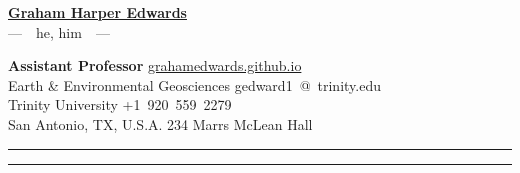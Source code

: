 \documentclass[10pt]{article}
\begin{document}
\begin{center}
\LARGE\textbf{\underline{Graham Harper Edwards}}\\[.3em]
\large ---~~he, him~~---
\end{center}

\textbf{Assistant Professor} \hfill \href{https://grahamedwards.github.io}{grahamedwards.github.io} \\
Earth \& Environmental Geosciences \hfill gedward1~@~trinity.edu \\
Trinity University \hfill +1~920~559~2279  \\
San Antonio, TX, U.S.A.	\hfill 234 Marrs McLean Hall






























\begin{center}{\rule{2.5in}{0.5pt}}\end{center}  \begin{center}\vspace{-16pt} {\rule{2.5in}{0.5pt}}\end{center}



\end{document}
